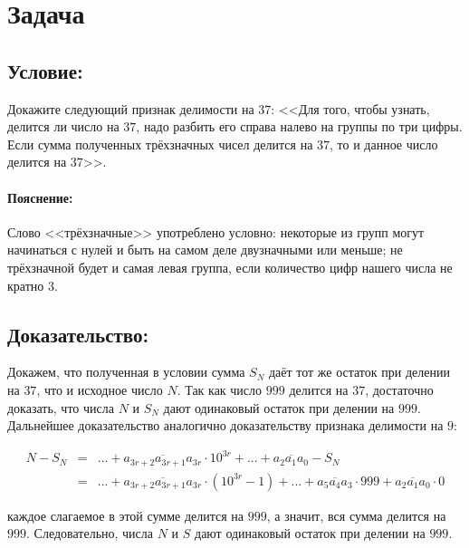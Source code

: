 \section{Задача}

\subsection*{Условие:}
Докажите следующий признак делимости на $37$: <<Для того, чтобы узнать, делится ли число на $37$, 
надо разбить его справа налево на группы по три цифры. Если сумма полученных трёхзначных чисел 
делится на $37$, то и данное число делится на $37$>>.

\paragraph*{Пояснение:}
Слово <<трёхзначные>> употреблено условно: некоторые из групп могут начинаться с нулей и быть на
самом деле двузначными или меньше; не трёхзначной будет и самая левая группа, если количество цифр
нашего числа не кратно $3$.

\subsection*{Доказательство:}
Докажем, что полученная в условии сумма $S_N$ даёт тот же остаток при делении на $37$, что и
исходное число $N$. Так как число $999$ делится на $37$, достаточно доказать, что числа $N$ и $S_N$
дают одинаковый остаток при делении на $999$. Дальнейшее доказательство аналогично доказательству
признака делимости на $9$:

\begin {equation*}
    \begin {array}  {rcl}
        N - S_N & = &
        ... + \overline{a_{3r+2} a_{3r+1} a_{3r}} \cdot 10^{3r} + ... +
        \overline{a_2 a_1 a_0} - S_N
        \\
        & = &
        ... + \overline{a_{3r+2} a_{3r+1} a_{3r}} \cdot \left(10^{3r} - 1\right) + ... +
        \overline{a_5 a_4 a_3} \cdot 999 + \overline{a_2 a_1 a_0} \cdot 0
    \end {array}
\end {equation*}

\noindent каждое слагаемое в этой сумме делится на $999$, а значит, вся сумма делится на $999$.
Следовательно, числа $N$ и $S$ дают одинаковый остаток при делении на $999$.